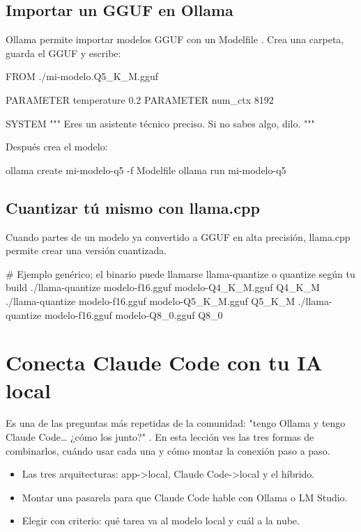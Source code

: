 \documentclass[11pt,a4paper]{book}
\begin{document}
\section{Importar un GGUF en Ollama}
Ollama permite importar modelos GGUF con un Modelfile . Crea una carpeta, guarda el GGUF y escribe:

\begin{codebox}
FROM ./mi-modelo.Q5_K_M.gguf

PARAMETER temperature 0.2
PARAMETER num_ctx 8192

SYSTEM """
Eres un asistente técnico preciso. Si no sabes algo, dilo.
"""
\end{codebox}
Después crea el modelo:

\begin{codebox}
ollama create mi-modelo-q5 -f Modelfile
ollama run mi-modelo-q5
\end{codebox}
\section{Cuantizar tú mismo con llama.cpp}
Cuando partes de un modelo ya convertido a GGUF en alta precisión, llama.cpp permite crear una versión cuantizada.

\begin{codebox}
# Ejemplo genérico; el binario puede llamarse llama-quantize o quantize según tu build
./llama-quantize modelo-f16.gguf modelo-Q4_K_M.gguf Q4_K_M
./llama-quantize modelo-f16.gguf modelo-Q5_K_M.gguf Q5_K_M
./llama-quantize modelo-f16.gguf modelo-Q8_0.gguf Q8_0
\end{codebox}
\chapter{Conecta Claude Code con tu IA local}
Es una de las preguntas más repetidas de la comunidad: "tengo Ollama y tengo Claude Code… ¿cómo los junto?" . En esta lección ves las tres formas de combinarlos, cuándo usar cada una y cómo montar la conexión paso a paso.

\begin{itemize}\item Las tres arquitecturas: app->local, Claude Code->local y el híbrido.\end{itemize}
\begin{itemize}\item Montar una pasarela para que Claude Code hable con Ollama o LM Studio.\end{itemize}
\begin{itemize}\item Elegir con criterio: qué tarea va al modelo local y cuál a la nube.\end{itemize}
\end{document}
